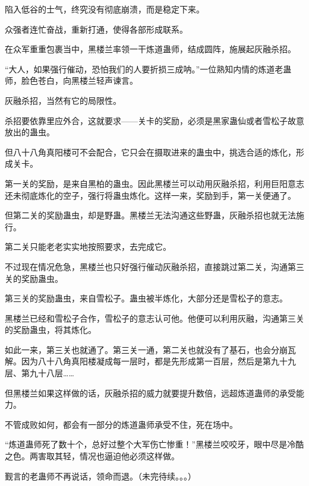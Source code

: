 \begin{this_body}
陷入低谷的士气，终究没有彻底崩溃，而是稳定下来。

众强者连忙奋战，重新打通，使得各部形成联系。

在众军重重包裹当中，黑楼兰率领一干炼道蛊师，结成圆阵，施展起灰融杀招。

“大人，如果强行催动，恐怕我们的人要折损三成呐。”一位熟知内情的炼道老蛊师，脸色苍白，向黑楼兰轻声谏言。

灰融杀招，当然有它的局限性。

杀招要依靠里应外合，这就要求——关卡的奖励，必须是黑家蛊仙或者雪松子故意放出的蛊虫。

但八十八角真阳楼可不会配合，它只会在摄取进来的蛊虫中，挑选合适的炼化，形成关卡。

第一关的奖励，是来自黑柏的蛊虫。因此黑楼兰可以动用灰融杀招，利用巨阳意志还未彻底炼化的空子，强行将蛊虫炼化。这样一来，奖励到手，第一关便通了。

但第二关的奖励蛊虫，却是野蛊。黑楼兰无法沟通这些野蛊，灰融杀招也就无法施行。

第二关只能老老实实地按照要求，去完成它。

不过现在情况危急，黑楼兰也只好强行催动灰融杀招，直接跳过第二关，沟通第三关的奖励蛊虫。

第三关的奖励蛊虫，来自雪松子。蛊虫被半炼化，大部分还是雪松子的意志。

黑楼兰已经和雪松子合作，雪松子的意志认可他。他便可以利用灰融，沟通第三关的奖励蛊虫，将其炼化。

如此一来，第三关也就通了。第三关一通，第二关也就没有了基石，也会分崩瓦解。因为八十八角真阳楼凝成每一层时，都是先形成第一百层，然后是第九十九层、第九十八层……

但黑楼兰如果这样做的话，灰融杀招的威力就要提升数倍，远超炼道蛊师的承受能力。

不管成败如何，都会有一部分的炼道蛊师承受不住，死在场中。

“炼道蛊师死了数十个，总好过整个大军伤亡惨重！”黑楼兰咬咬牙，眼中尽是冷酷之色。两害取其轻，情况也逼迫他必须这样做。

觐言的老蛊师不再说话，领命而退。（未完待续。。。）

\end{this_body}

